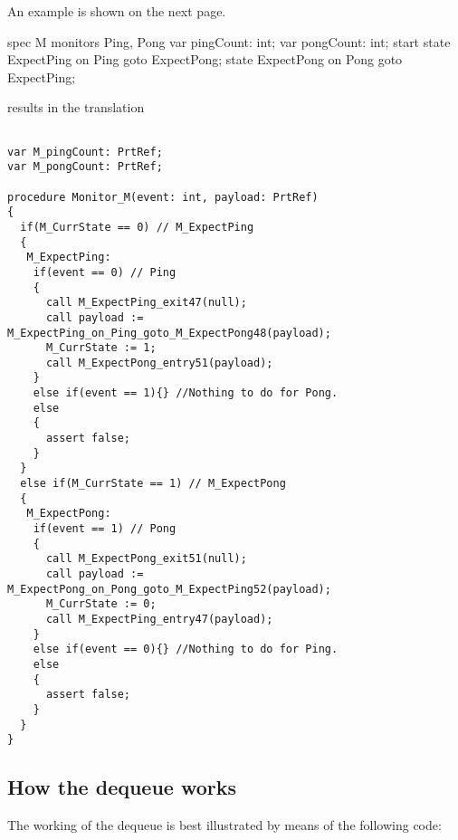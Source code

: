 \documentclass{llncs}
\begin{document}
An example is shown on the next page.

\pagebreak
\begin{psharpNoLines}
spec M monitors Ping, Pong {
var pingCount: int;
var pongCount: int;
  start state ExpectPing {
    on Ping goto ExpectPong;
  }
  state ExpectPong {
    on Pong goto ExpectPing;
  }
}
\end{psharpNoLines}

results in the translation

\begin{verbatim}

var M_pingCount: PrtRef;
var M_pongCount: PrtRef;

procedure Monitor_M(event: int, payload: PrtRef)
{
  if(M_CurrState == 0) // M_ExpectPing
  {
   M_ExpectPing:
    if(event == 0) // Ping
    {
      call M_ExpectPing_exit47(null);
      call payload := M_ExpectPing_on_Ping_goto_M_ExpectPong48(payload);
      M_CurrState := 1;
      call M_ExpectPong_entry51(payload);
    }
    else if(event == 1){} //Nothing to do for Pong.
    else
    {
      assert false;
    }
  }
  else if(M_CurrState == 1) // M_ExpectPong
  {
   M_ExpectPong:
    if(event == 1) // Pong
    {
      call M_ExpectPong_exit51(null);
      call payload := M_ExpectPong_on_Pong_goto_M_ExpectPing52(payload);
      M_CurrState := 0;
      call M_ExpectPing_entry47(payload);
    }
    else if(event == 0){} //Nothing to do for Ping.
    else
    {
      assert false;
    }
  }
}
\end{verbatim}

\pagebreak

\subsection{How the dequeue works}
The working of the dequeue is best illustrated by means of the following code:
\end{document}
